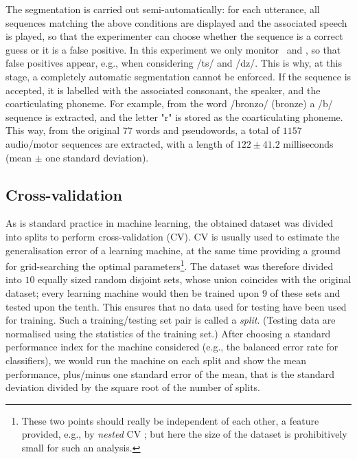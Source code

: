 The segmentation is carried out semi-automatically: for each
utterance, all sequences matching the above conditions are displayed and the
associated speech is played, so that the experimenter can choose whether the
sequence is a correct guess or it is a false positive. In this experiment we only
monitor \lio\ and \ttu, so that false positives appear, e.g., when considering
/ts/ and /dz/. This is why, at this stage, a completely automatic segmentation
cannot be enforced. If the sequence is accepted, it is labelled
with the associated consonant, the speaker, and the
coarticulating phoneme. For example, from the word /bronzo/ (bronze) a /b/
sequence is extracted, and the letter "r" is stored as the coarticulating phoneme.
This way, from the original $77$ words and pseudowords, a total
of $1157$ audio/motor sequences are extracted, with a length of $122 \pm 41.2$
milliseconds (mean $\pm$ one standard deviation).

%
%
%
%
%
%
%

\subsection{Cross-validation}
\label{subsec:cv}

As is standard practice in machine learning, the obtained dataset was divided into
splits to perform cross-validation (CV). CV \cite{stat} is usually used
to estimate the generalisation error of a learning machine, at the
same time providing a ground for grid-searching the optimal parameters\footnote{These
two points should really be independent of each other, a feature provided, e.g., by
\emph{nested} CV \cite{nestedCV}; but here the size of the dataset is
prohibitively small for such an analysis.}. The dataset was therefore divided into
$10$ equally sized random disjoint sets, whose union coincides with the original dataset; every
learning machine would then be trained upon $9$ of these sets and tested upon the
tenth. This ensures that no data used for testing have been used for training. Such a
training/testing set pair is called a \emph{split}. (Testing data are normalised using the
statistics of the training set.) After choosing a standard performance index for the machine
considered (e.g., the balanced error rate for classifiers), we would run the machine
on each split and show the mean performance, plus/minus one standard error of the mean,
that is the standard deviation divided by the square root of the number of splits.

